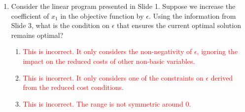 \documentclass{article}%
\newcommand{\incorrect}[1]{\textcolor{red}{#1}}
\begin{document}
\begin{enumerate}
\begin{enumerate}
\item \incorrect{The identity matrix is used in the initial formulation to introduce slack variables, but it's not central to the sensitivity analyses presented in Slides 7 and 11.}%
\item \incorrect{While $B$ is involved, it's $B^{-1}$ that's directly used in the calculations.  $B$ itself is not directly manipulated in the sensitivity analysis presented in the slides.}%
\end{enumerate}%
\vspace{1em}%
\item Consider the linear program presented in Slide 1. Suppose we increase the coefficient of $x_1$ in the objective function by $\epsilon$.  Using the information from Slide 3, what is the condition on $\epsilon$ that ensures the current optimal solution remains optimal?%
\begin{enumerate}%
\item \incorrect{This is incorrect. It only considers the non-negativity of $\epsilon$, ignoring the impact on the reduced costs of other non-basic variables.}%
\item \incorrect{This is incorrect. It only considers one of the constraints on $\epsilon$ derived from the reduced cost conditions.}%
\item \incorrect{This is incorrect. The range is not symmetric around 0.}%

\end{enumerate}
\end{enumerate}
\end{document}
